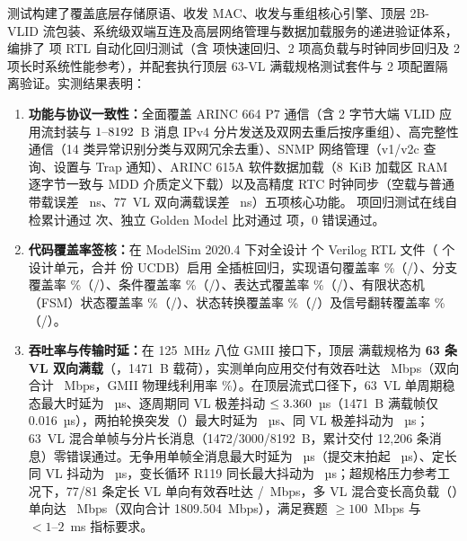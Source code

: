 \documentclass[a4paper,zihao=-4,fontset=none,oneside,openany]{ctexrep}
\begin{document}
测试构建了覆盖底层存储原语、收发 MAC、收发与重组核心引擎、顶层 2B-VLID 流包装、系统级双端互连及高层网络管理与数据加载服务的递进验证体系，编排了 \RegCount{} 项 RTL 自动化回归测试（含 \RegFastCount{} 项快速回归、2 项高负载与时钟同步回归及 2 项长时系统性能参考），并配套执行顶层 63-VL 满载规格测试套件与 2 项配置隔离验证。实测结果表明：
\begin{enumerate}[label=（\arabic*）]
  \item \textbf{功能与协议一致性：}全面覆盖 ARINC 664 P7 通信（含 2 字节大端 VLID 应用流封装与 $1\text{--}8192{}$~B 消息 IPv4 分片发送及双网去重后按序重组）、高完整性通信（14 类异常识别分类与双网冗余去重）、SNMP 网络管理（v1/v2c 查询、设置与 Trap 通知）、ARINC 615A 软件数据加载（8~KiB 加载区 RAM 逐字节一致与 MDD 介质定义下载）以及高精度 RTC 时钟同步（空载与普通带载误差 \RtcIdle{}~ns、77~VL 双向满载误差 \RtcLoad{}~ns）五项核心功能。\RegCount{} 项回归测试在线自检累计通过 \countsep{\RegChecks} 次、独立 Golden Model 比对通过 \countsep{\RegIndep} 项，0 错误通过。
  \item \textbf{代码覆盖率签核：}在 ModelSim 2020.4 下对全设计 \RtlFileCount{} 个 Verilog RTL 文件（\DesignUnitCount{} 个设计单元，合并 \CovUcdbCount{} 份 UCDB）启用  全插桩回归，实现语句覆盖率 \CovStmt\%（\CovStmtCov/\CovStmtTot）、分支覆盖率 \CovBranch\%（\CovBranchCov/\CovBranchTot）、条件覆盖率 \CovCond\%（\CovCondCov/\CovCondTot）、表达式覆盖率 \CovExpr\%（\CovExprCov/\CovExprTot）、有限状态机（FSM）状态覆盖率 \CovFsmState\%（\CovFsmStateCov/\CovFsmStateTot）、状态转换覆盖率 \CovFsmTrans\%（\CovFsmTransCov/\CovFsmTransTot）及信号翻转覆盖率 \CovToggle\%（\CovToggleCov/\CovToggleTot）。
  \item \textbf{吞吐率与传输时延：}在 125~MHz 八位 GMII 接口下，顶层  满载规格为 \textbf{63 条 VL 双向满载}（，1471~B 载荷），实测单向应用交付有效吞吐达 \ThruSixtyThree~Mbps（双向合计 \ThruSixtyThreeBi~Mbps，GMII 物理线利用率 \LineUtilSixtyThree\%）。在顶层流式口径下，63~VL 单周期稳态最大时延为 \LatSixtyThreePMax~µs、逐周期同 VL 极差抖动 $\le3.360$~µs（1471~B 满载帧仅 0.016~µs），两拍轮换突发（）最大时延为 \LatSixtyThreeBTwo~µs、同 VL 极差抖动为 \JitSixtyThreeBTwo~µs；63~VL 混合单帧与分片长消息（1472/3000/8192~B，累计交付 12,206 条消息）零错误通过。无争用单帧全消息最大时延为 \Lat~µs（提交末拍起 \LatAppLast~µs）、定长同 VL 抖动为 \JitSameVl~µs，变长循环 R119 同长最大抖动为 \JitVarCycleTop~µs；超规格压力参考工况下，77/81 条定长 VL 单向有效吞吐达 \Thru{}/\ThruEightyOne~Mbps，多 VL 混合变长高负载（）单向达 \ThruVarHigh~Mbps（双向合计 1809.504~Mbps），满足赛题 $\ge 100$~Mbps 与 $<1\text{--}2$~ms 指标要求。

\end{enumerate}
\end{document}

